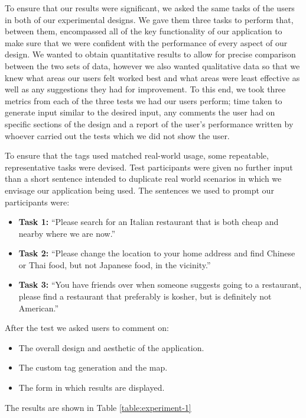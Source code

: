 \documentclass[10pt,a4paper]{article}
\begin{document}
To ensure that our results were significant, we asked the same tasks of the users in both of our experimental designs. We gave them three tasks to perform that, between them, encompassed all of the key functionality of our application to make sure that we were confident with the performance of every aspect of our design. We wanted to obtain quantitative results to allow for precise comparison between the two sets of data, however we also wanted qualitative data so that we knew what areas our users felt worked best and what areas were least effective as well as any suggestions they had for improvement. To this end, we took three metrics from each of the three tests we had our users perform; time taken to generate input similar to the desired input, any comments the user had on specific sections of the design and a report of the user’s performance written by whoever carried out the tests which we did not show the user.

To ensure that the tags used matched real-world usage, some repeatable, representative tasks were devised. Test participants were given no further input than a short sentence intended to duplicate real world scenarios in which we envisage our application being used. The sentences we used to prompt our participants were:


\begin{itemize}
\item \textbf{Task 1:} “Please search for an Italian restaurant that is both cheap and nearby where we are now.”
\item \textbf{Task 2:} “Please change the location to your home address and find Chinese or Thai food, but not Japanese food, in the vicinity.”
\item \textbf{Task 3:} “You have friends over when someone suggests going to a restaurant, please find a restaurant that preferably is kosher, but is definitely not American.”
\end{itemize}

\noindent After the  test we asked users to comment on:

\begin{itemize}
	\item The overall design and aesthetic of the application.
	\item The custom tag generation and the map.
	\item The form in which results are displayed.
\end{itemize}

\noindent The results are shown in Table \ref{table:experiment-1}
\end{document}
